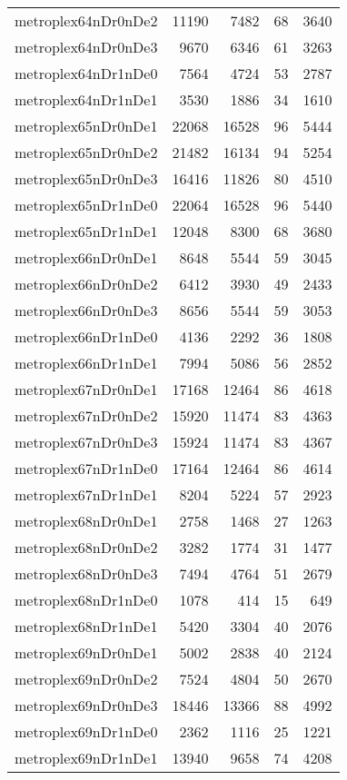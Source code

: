 \begin{longtable}{lrrrr}
metroplex64nDr0nDe2 & 11190 & 7482 & 68 & 3640 \\
metroplex64nDr0nDe3 & 9670 & 6346 & 61 & 3263 \\
metroplex64nDr1nDe0 & 7564 & 4724 & 53 & 2787 \\
metroplex64nDr1nDe1 & 3530 & 1886 & 34 & 1610 \\
metroplex65nDr0nDe1 & 22068 & 16528 & 96 & 5444 \\
metroplex65nDr0nDe2 & 21482 & 16134 & 94 & 5254 \\
metroplex65nDr0nDe3 & 16416 & 11826 & 80 & 4510 \\
metroplex65nDr1nDe0 & 22064 & 16528 & 96 & 5440 \\
metroplex65nDr1nDe1 & 12048 & 8300 & 68 & 3680 \\
metroplex66nDr0nDe1 & 8648 & 5544 & 59 & 3045 \\
metroplex66nDr0nDe2 & 6412 & 3930 & 49 & 2433 \\
metroplex66nDr0nDe3 & 8656 & 5544 & 59 & 3053 \\
metroplex66nDr1nDe0 & 4136 & 2292 & 36 & 1808 \\
metroplex66nDr1nDe1 & 7994 & 5086 & 56 & 2852 \\
metroplex67nDr0nDe1 & 17168 & 12464 & 86 & 4618 \\
metroplex67nDr0nDe2 & 15920 & 11474 & 83 & 4363 \\
metroplex67nDr0nDe3 & 15924 & 11474 & 83 & 4367 \\
metroplex67nDr1nDe0 & 17164 & 12464 & 86 & 4614 \\
metroplex67nDr1nDe1 & 8204 & 5224 & 57 & 2923 \\
metroplex68nDr0nDe1 & 2758 & 1468 & 27 & 1263 \\
metroplex68nDr0nDe2 & 3282 & 1774 & 31 & 1477 \\
metroplex68nDr0nDe3 & 7494 & 4764 & 51 & 2679 \\
metroplex68nDr1nDe0 & 1078 & 414 & 15 & 649 \\
metroplex68nDr1nDe1 & 5420 & 3304 & 40 & 2076 \\
metroplex69nDr0nDe1 & 5002 & 2838 & 40 & 2124 \\
metroplex69nDr0nDe2 & 7524 & 4804 & 50 & 2670 \\
metroplex69nDr0nDe3 & 18446 & 13366 & 88 & 4992 \\
metroplex69nDr1nDe0 & 2362 & 1116 & 25 & 1221 \\
metroplex69nDr1nDe1 & 13940 & 9658 & 74 & 4208 \\

\end{longtable}
